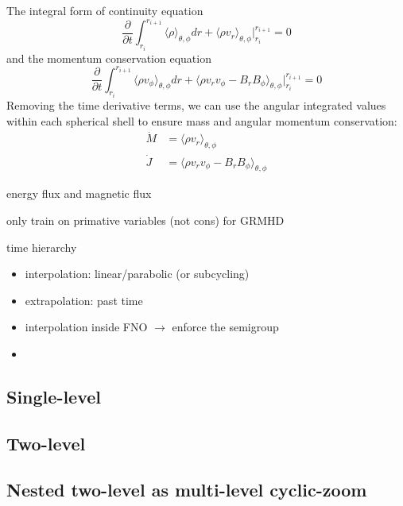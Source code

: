 \documentclass[%
 reprint,
 superscriptaddress,
 amsmath,amssymb,
 nofootinbib,
 prd,
]{revtex4-2}
\begin{document}
The integral form of continuity equation
\begin{equation}
    \frac{\partial}{\partial t} \int_{r_i}^{r_{i+1}}\langle \rho \rangle_{\theta,\phi} dr + \langle \rho v_r\rangle_{\theta,\phi}|_{r_i}^{r_{i+1}}=0
\end{equation}
and the momentum conservation equation 
\begin{equation}
    \frac{\partial}{\partial t} \int_{r_i}^{r_{i+1}}\langle \rho v_\phi \rangle_{\theta,\phi} dr + \langle \rho v_r v_\phi - B_rB_\phi\rangle_{\theta,\phi}|_{r_i}^{r_{i+1}}=0
\end{equation}
Removing the time derivative terms, we can use the angular integrated values within each spherical shell to ensure mass and angular momentum conservation: 
\begin{align}
    \dot M & = \langle \rho v_r\rangle_{\theta,\phi} \\
    \dot J & = \langle \rho v_r v_\phi - B_rB_\phi\rangle_{\theta,\phi}
\end{align}

energy flux and magnetic flux 

only train on primative variables (not cons) for GRMHD

time hierarchy
\begin{itemize}
    \item interpolation: linear/parabolic (or subcycling)
    \item extrapolation: past time
    \item interpolation inside FNO $\to$ enforce the semigroup
    \item 
\end{itemize}


\subsection{Single-level}

\subsection{Two-level}

\subsection{Nested two-level as multi-level cyclic-zoom}

\end{document}
